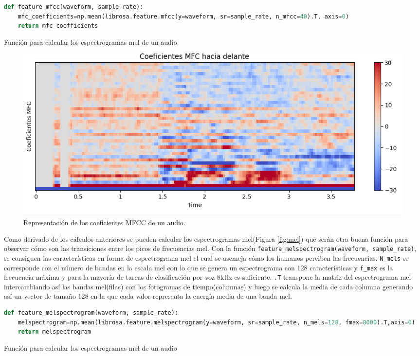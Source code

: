 \begin{code}[H]
\begin{lstlisting}[language=Python]
def feature_mfcc(waveform, sample_rate):
    mfc_coefficients=np.mean(librosa.feature.mfcc(y=waveform, sr=sample_rate, n_mfcc=40).T, axis=0)
    return mfc_coefficients
\end{lstlisting}
\caption[Función para calcular los espectrogramas mel de un audio]{Función para calcular los espectrogramas mel de un audio}
\label{cod:codejemplo5}
\end{code}

\begin{figure}[H]
  \centering
  \includegraphics[scale=0.4]{figs/coeficientes_mfc} %
  \caption{ Representación de los coeficientes MFCC de un audio.}
  \label{fig:mfcc}
\end{figure}

Como derivado de los cálculos anteriores se pueden calcular los espectrogramas mel(Figura \ref{fig:mel}) que serán otra buena función para observar cómo son las transiciones entre los picos de frecuencias mel. Con la función \verb|feature_melspectrogram(waveform, sample_rate)|, se consiguen las características en forma de espectrograma mel el cual se asemeja cómo los humanos perciben las frecuencias. \texttt{N\_mels} se corresponde con el número de bandas en la escala mel con lo que se genera un espectrograma con 128 características y \texttt{f\_max} es la frecuencia máxima y para la mayoría de tareas de clasificación por voz 8kHz es suficiente. \texttt{.T} transpone la matriz del espectrograma mel intercambiando así las bandas mel(filas) con los fotogramas de tiempo(columnas) y luego se calcula la media de cada columna generando así un vector de tamaño 128 en la que cada valor representa la energía media de una banda mel.



\begin{code}[H]
\begin{lstlisting}[language=Python]
def feature_melspectrogram(waveform, sample_rate):
    melspectrogram=np.mean(librosa.feature.melspectrogram(y=waveform, sr=sample_rate, n_mels=128, fmax=8000).T,axis=0)
    return melspectrogram
\end{lstlisting}
\caption[Función para calcular los espectrogramas mel de un audio]{Función para calcular los espectrogramas mel de un audio}
\label{cod:codejemplo5}
\end{code}

